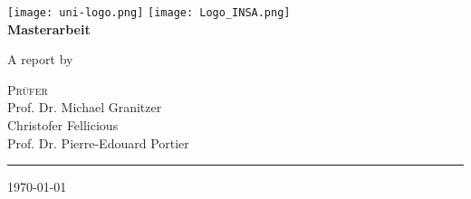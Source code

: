\begin{titlepage}
    \centering
    \begin{onehalfspace}
    	
        	\texttt{[image: uni-logo.png]}
			\hspace*{1.0cm}
			\texttt{[image: Logo\_INSA.png]}\\
        	\vspace{1.0cm}
        	{\Large \bfseries Masterarbeit}\\

        	\vspace{2.5cm}

            \begin{doublespace}
            	{\textsf{\Huge{\thetitle}}}
            \end{doublespace}

        	\vspace{2cm}

            {\Large A report by}\\

        	\vspace{1cm}

        	{\bfseries \large{\theauthor}}

        	\vfill

        	{\Large
                \textsc{Pr\"ufer} \\
                Prof. Dr. Michael Granitzer\\
				Christofer Fellicious\\
				Prof. Dr. Pierre-Edouard Portier\\ 
        	}

        	\vspace{1.5cm}

        	\parbox{\linewidth}{\hrule\strut}

            \vfill

			{\large \today}
    \end{onehalfspace}
\end{titlepage}

